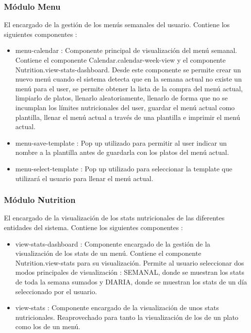 \documentclass[12pt, a4paper, twoside]{book}
\begin{document}
	\subsubsection{Módulo Menu}
	El encargado de la gestión de los menús semanales del usuario. Contiene los siguientes componentes : 
	\begin{itemize}
		\item menu-calendar : Componente principal de visualización del menú semanal. Contiene el componente Calendar.calendar-week-view y el componente Nutrition.view-stats-dashboard. Desde este componente se permite crear un nuevo menú cuando el sistema detecta que en la semana actual no existe un menú para el user, se permite obtener la lista de la compra del menú actual, limpiarlo de platos, llenarlo aleatoriamente, llenarlo de forma que no se incumplan los límites nutricionales del user, guardar el menú actual como plantilla, llenar el menú actual a través de una plantilla e imprimir el menú actual.
		\item menu-save-template : Pop up utilizado para permitir al user indicar un nombre a la plantilla antes de guardarla con los platos del menú actual.
		\item menu-select-template : Pop up utilizado para seleccionar la template que utilizará el usuario para llenar el menú actual.
	\end{itemize}
	\subsubsection{Módulo Nutrition}
	El encargado de la visualización de los stats nutricionales de las diferentes entidades del sistema. Contiene los siguientes componentes : 
	\begin{itemize}
		\item view-stats-dashboard : Componente encargado de la gestión de la visualización de los stats de un menú. Contiene el componente Nutrition.view-stats para su visualización. Permite al usuario seleccionar dos modos principales de visualización : SEMANAL, donde se muestran los stats de toda la semana sumados y DIARIA, donde se muestran los stats de un día seleccionado por el usuario.
		\item view-stats : Componente encargado de la visualización de unos stats nutricionales. Reaprovechado para tanto la visualización de los de un plato como los de un menú.
	\end{itemize}
\end{document}
